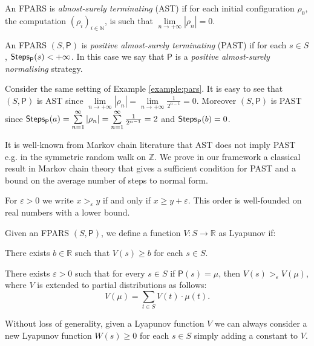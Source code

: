 \begin{definition}
	An FPARS is \emph{almost-surely terminating} (AST) if for each initial configuration $\rho_0$, the computation $(\rho_i)_{i\in\mathbb{N}}$, is such that $\underset{n\rightarrow +\infty}{\lim}\left|\rho_{n}\right|=0$.
\end{definition}
\begin{definition}
	An FPARS $(S,\mathsf{P})$ is \emph{positive almost-surely terminating} (PAST) if for each $s \in S$,
	$\mathsf{Steps}_{\mathsf{P}}(s)< +\infty$.
	In this case we say that $\mathsf{P}$ is a \emph{positive almost-surely normalising} strategy.
\end{definition}
\begin{example}
	Consider the same setting of Example \ref{example:pars}. It is easy to see that $(S,\mathsf{P})$ is AST since $\underset{n\rightarrow +\infty}{\lim}\left|\rho_{n}\right|=\underset{n\rightarrow +\infty}{\lim}\frac{1}{2^{n-1}}=0$. Moreover $(S,\mathsf{P})$ is PAST since $\mathsf{Steps}_{\mathsf{P}}(a)=\sum\limits_{n=1}^{\infty} \left|\rho_n\right|=\sum\limits_{n=1}^{\infty}\frac{1}{2^{n-1}}=2$ and $\mathsf{Steps}_{\mathsf{P}}(b)=0$.
\end{example}
It is well-known from Markov chain literature that AST does not imply PAST e.g. in the symmetric random walk on $\mathbb{Z}$. We prove in our framework a classical result in Markov chain theory that gives a sufficient condition for PAST and a bound on the average number of steps to normal form.
\begin{notation}
	For $\varepsilon>0$ we write $x>_{\varepsilon}y$ if and only if $x\geq y+\varepsilon$. This order is well-founded on real numbers with a lower bound.
\end{notation}
\begin{definition}
	Given an FPARS $\left( S,\mathsf{P}\right)$, we define a function $V:S\rightarrow\mathbb{R}$ as Lyapunov if:
	\begin{varitemize}
		\item
		There exists $b\in\mathbb{R}$ such that $V\left(s\right)\geq b$ for each $s\in S$.
		\item
		There exists $\varepsilon>0$ such that for every $s\in S$ if $\mathsf{P}\left(s\right) = \mu$, then $V\left(s\right) >_{\varepsilon} V\left(\mu\right)$, where $V$ is extended to partial distributions as follows:
		$$
		V\left(\mu\right)=\sum_{t\in S}V\left(t\right)\cdot\mu\left(t\right).
		$$
	\end{varitemize}
\end{definition}
\begin{remark}
	Without loss of generality, given a Lyapunov function $V$ we can always consider a new Lyapunov function $W(s)\geq 0$ for each $s\in S$ simply adding a constant to $V$.
\end{remark}
